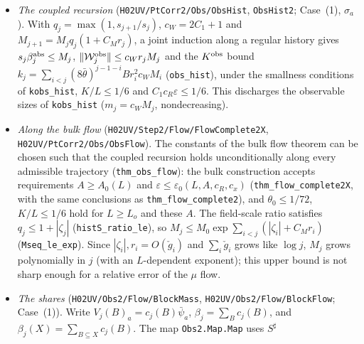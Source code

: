 \documentclass[11pt]{amsart}
\theoremstyle{definition}
\theoremstyle{remark}
\numberwithin{equation}{section}
\newcommand{\cS}{\mathcal{S}}
\begin{document}
\begin{itemize}
  With the pointed $\operatorname{loc}^a$ the coupling is spread over the blocks, and the quantity with leading coefficient $1$
  is the $\ell^1$ sum $\beta^{\rm abs}=\sum_B|m_1(V(B)_a)|$: $\sum_{B\subseteq X}|m(\operatorname{loc}^a_{X,B}F)|=|m(F)|$
  (\texttt{sum\_norm\_locAp\_blocks}), so $\beta^{\rm abs}_{j+1}\le\beta^{\rm abs}_j+\sum_{X\in\cS_j}|m(K(X)_a)|+\sum_B|m(S(B)_a)|$
  (\texttt{abs\_mass\_step}), and with pair bounds with block-dependent sizes and the symmetry of the near relation,
  $\beta^{\rm abs}_{j+1}\le\beta^{\rm abs}_j+cC_m\ell^{-1}k+C_m\ell'^{-1}(2c_{\rm near}Q_1^2r\ell\beta^{\rm abs}_j+c'Q_1m_{\mathcal W})$
  (\texttt{beta\_step}, \texttt{beta\_raw\_step}). Since $\|V(B)_a\|_{T_j(\ell)}=|m_1(V(B)_a)|\ell$, $\ell_j\beta^{\rm abs}_j$ bounds
  all blocks.
\item \emph{The coupled recursion} (\texttt{H02UV/PtCorr2/Obs/ObsHist}, \texttt{ObsHist2}; Case~(1), $\sigma_a$). With
  $q_j=\max(1,s_{j+1}/s_j)$, $c_W=2C_1+1$ and $M_{j+1}=M_jq_j(1+C_Mr_j)$, a joint induction along a regular history gives
  $s_j\beta^{\rm abs}_j\le M_j$, $\|\mathcal W^{\rm obs}_j\|\le c_Wr_jM_j$ and the $K^{\rm obs}$ bound
  $k_j=\sum_{i<j}(8\bar\theta)^{j-1-i}Br_i^2c_WM_i$ (\texttt{obs\_hist}), under the smallness conditions of \texttt{kobs\_hist},
  $K/L\le1/6$ and $C_1c_R\varepsilon\le1/6$. This discharges the observable sizes of \texttt{kobs\_hist}
  ($m_j=c_WM_j$, nondecreasing).
\item \emph{Along the bulk flow} (\texttt{H02UV/Step2/Flow/FlowComplete2X}, \texttt{H02UV/PtCorr2/Obs/ObsFlow}). The constants of the bulk flow
  theorem can be chosen such that the coupled recursion holds unconditionally along every admissible trajectory
  (\texttt{thm\_obs\_flow}): the bulk construction accepts requirements $A\ge A_0(L)$ and $\varepsilon\le\varepsilon_0(L,A,c_R,c_x)$
  (\texttt{thm\_flow\_complete2X}, with the same conclusions as \texttt{thm\_flow\_complete2}), and $\theta_0\le1/72$,
  $K/L\le1/6$ hold for $L\ge L_o$ and these $A$. The field-scale ratio satisfies $q_j\le1+|\zeta_j|$
  (\texttt{histS\_ratio\_le}), so $M_j\le M_0\exp\sum_{i<j}(|\zeta_i|+C_Mr_i)$ (\texttt{Mseq\_le\_exp}). Since
  $|\zeta_i|,r_i=O(\check g_i)$ and $\sum_i\check g_i$ grows like $\log j$, $M_j$ grows polynomially in $j$
  (with an $L$-dependent exponent); this upper bound is not sharp enough for a relative error of the $\mu$ flow.
\item \emph{The shares} (\texttt{H02UV/Obs2/Flow/BlockMass}, \texttt{H02UV/Obs2/Flow/BlockFlow}; Case~(1)). Write $V_j(B)_a=c_j(B)\bar\psi_a$,
  $\beta_j=\sum_Bc_j(B)$, and $\beta_j(X)=\sum_{B\subseteq X}c_j(B)$. The map \texttt{Obs2.Map.Map} uses $S^\sharp$

\end{itemize}
\end{document}
